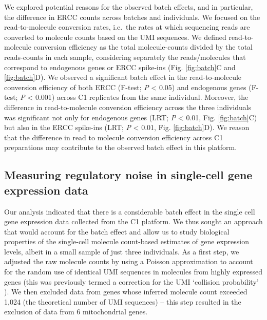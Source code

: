 We explored potential reasons for the observed batch effects, and in
particular, the difference in ERCC counts across batches and
individuals. We focused on the read-to-molecule conversion rates,
i.e.~the rates at which sequencing reads are converted to molecule
counts based on the UMI sequences. We defined read-to-molecule
conversion efficiency as the total molecule-counts divided by the total
reads-counts in each sample, considering separately the reads/molecules
that correspond to endogenous genes or ERCC spike-ins (Fig. \ref{fig:batch}C and \ref{fig:batch}D).
We observed a significant batch effect in the read-to-molecule
conversion efficiency of both ERCC (F-test; \emph{P} \textless{} 0.05)
and endogenous genes (F-test; \emph{P} \textless{} 0.001) across C1
replicates from the same individual. Moreover, the difference in
read-to-molecule conversion efficiency across the three individuals was
significant not only for endogenous genes (LRT; \emph{P} \textless{}
0.01, Fig. \ref{fig:batch}C) but also in the ERCC spike-ins (LRT; \emph{P} \textless{}
0.01, Fig. \ref{fig:batch}D). We reason that the difference in read to molecule
conversion efficiency across C1 preparations may contribute to the
observed batch effect in this platform.

\subsection{Measuring regulatory noise in single-cell gene expression
data}\label{measuring-regulatory-noise-in-single-cell-gene-expression-data}

Our analysis indicated that there is a considerable batch effect in the
single cell gene expression data collected from the C1 platform. We thus
sought an approach that would account for the batch effect and allow us
to study biological properties of the single-cell molecule count-based
estimates of gene expression levels, albeit in a small sample of just
three individuals. As a first step, we adjusted the raw molecule counts
by using a Poisson approximation to account for the random use of
identical UMI sequences in molecules from highly expressed genes (this
was previously termed a correction for the UMI `collision probability'
\citep{Fu2011}). We then excluded data from genes whose inferred molecule
count exceeded 1,024 (the theoretical number of UMI sequences) -- this
step resulted in the exclusion of data from 6 mitochondrial genes.

